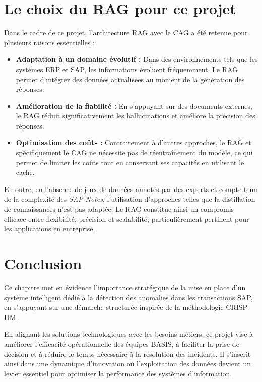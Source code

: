 \section{Le choix du RAG pour ce projet}

Dans le cadre de ce projet, l’architecture RAG avec le CAG a été retenue pour plusieurs raisons essentielles :

\begin{itemize}[leftmargin=*, label=\textbullet]

  \item \textbf{Adaptation à un domaine évolutif :}
  Dans des environnements tels que les systèmes ERP et SAP, les informations évoluent fréquemment. Le RAG permet d’intégrer des données actualisées au moment de la génération des réponses.

  \item \textbf{Amélioration de la fiabilité :}
  En s’appuyant sur des documents externes, le RAG réduit significativement les hallucinations et améliore la précision des réponses.

  \item \textbf{Optimisation des coûts :}
  Contrairement à d’autres approches, le RAG et spécifiquement le CAG ne nécessite pas de réentraînement du modèle, ce qui permet de limiter les coûts tout en conservant ses capacités en utilisant le cache.

\end{itemize}

En outre, en l’absence de jeux de données annotés par des experts et compte tenu de la complexité des \textit{SAP Notes}, l’utilisation d’approches telles que la distillation de connaissances n’est pas adaptée. Le RAG constitue ainsi un compromis efficace entre flexibilité, précision et scalabilité, particulièrement pertinent pour les applications en entreprise.

\section*{Conclusion}

Ce chapitre met en évidence l’importance stratégique de la mise en place d’un système intelligent dédié à la détection des anomalies dans les transactions SAP, en s’appuyant sur une démarche structurée inspirée de la méthodologie CRISP-DM.

En alignant les solutions technologiques avec les besoins métiers, ce projet vise à améliorer l’efficacité opérationnelle des équipes BASIS, à faciliter la prise de décision et à réduire le temps nécessaire à la résolution des incidents. Il s’inscrit ainsi dans une dynamique d’innovation où l’exploitation des données devient un levier essentiel pour optimiser la performance des systèmes d’information.